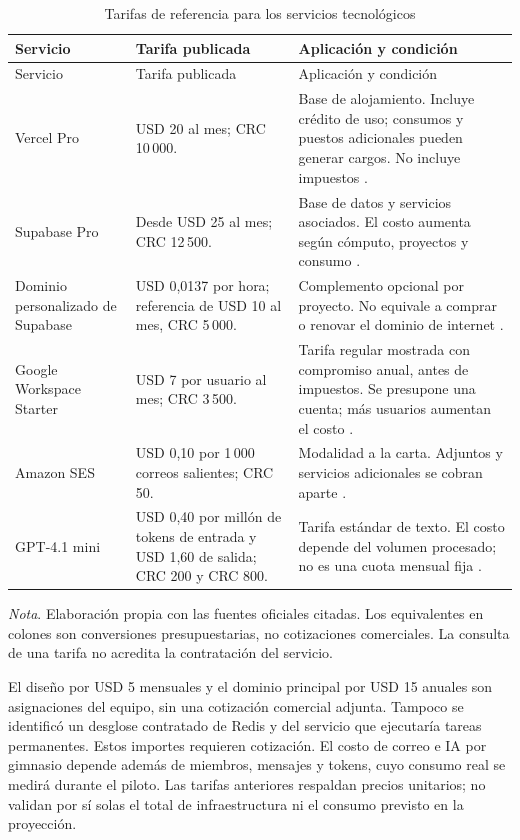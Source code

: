 \begin{longtable}{p{3.1cm}p{4.0cm}p{6.8cm}}
\caption{Tarifas de referencia para los servicios tecnológicos}\\
\toprule Servicio & Tarifa publicada & Aplicación y condición \\
\midrule\endfirsthead
\toprule Servicio & Tarifa publicada & Aplicación y condición \\
\midrule\endhead
Vercel Pro & USD 20 al mes; CRC 10\,000. & Base de alojamiento. Incluye crédito de uso; consumos y puestos adicionales pueden generar cargos. No incluye impuestos \parencite{vercel_precios}. \\
Supabase Pro & Desde USD 25 al mes; CRC 12\,500. & Base de datos y servicios asociados. El costo aumenta según cómputo, proyectos y consumo \parencite{supabase_precios}. \\
Dominio personalizado de Supabase & USD 0,0137 por hora; referencia de USD 10 al mes, CRC 5\,000. & Complemento opcional por proyecto. No equivale a comprar o renovar el dominio de internet \parencite{supabase_dominio}. \\
Google Workspace Starter & USD 7 por usuario al mes; CRC 3\,500. & Tarifa regular mostrada con compromiso anual, antes de impuestos. Se presupone una cuenta; más usuarios aumentan el costo \parencite{google_workspace_precios}. \\
Amazon SES & USD 0,10 por 1\,000 correos salientes; CRC 50. & Modalidad a la carta. Adjuntos y servicios adicionales se cobran aparte \parencite{aws_ses_precios}. \\
GPT-4.1 mini & USD 0,40 por millón de tokens de entrada y USD 1,60 de salida; CRC 200 y CRC 800. & Tarifa estándar de texto. El costo depende del volumen procesado; no es una cuota mensual fija \parencite{openai_mini_precios}. \\
\bottomrule
\end{longtable}
{\small\textit{Nota}. Elaboración propia con las fuentes oficiales citadas.
Los equivalentes en colones son conversiones presupuestarias, no cotizaciones
comerciales. La consulta de una tarifa no acredita la contratación del servicio.}

El diseño por USD 5 mensuales y el dominio principal por USD 15 anuales son
asignaciones del equipo, sin una cotización comercial adjunta. Tampoco se
identificó un desglose contratado de Redis y del servicio que ejecutaría tareas
permanentes. Estos importes requieren cotización. El costo de correo e IA
por gimnasio depende además de miembros, mensajes y tokens, cuyo consumo real
se medirá durante el piloto. Las tarifas anteriores respaldan precios
unitarios; no validan por sí solas el total de infraestructura ni el consumo
previsto en la proyección.

